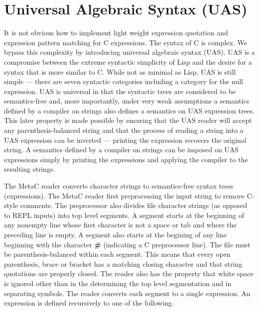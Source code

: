 \documentclass{article}
\begin{document}
\section{Universal Algebraic Syntax (UAS)}

It is not obvious how to implement light weight expression quotation and expression pattern matching for C expressions.  The syntax of C is complex.  We bypass this complexity by introducing universal algebraic syntax (UAS).
UAS is a compromise between the extreme syntactic simplicity of Lisp and the desire for a syntax that is more similar to C.
While not as minimal as Lisp, UAS is still simple --- there are seven syntactic categories including a category for the null expression.
UAS is universal in that the syntactic trees are considered to be semantics-free and, more importantly, under very weak assumptions a semantics defined by a compiler on strings
also defines a semantics on UAS expression trees.
This later property is made possible by ensuring that the UAS reader will accept any parenthesis-balanced string
and that the process of reading a string into a UAS expression can be inverted --- printing the expression recovers the original string.
A semantics defined by a compiler on strings can be imposed on UAS expressions simply by printing the expressions and applying the compiler to the resulting strings.

The MetaC reader converts character strings to semantics-free syntax trees (expressions).
The MetaC reader first preprocessing the input string to remove C-style comments.
The preprocessor also divides file character strings (as opposed to REPL inputs) into top level segments.
A segment starts at the beginning of any nonempty line whose first character is not a space or tab and where the preceding line is empty.
A segment also starts at the begining of any line beginning with the character {\bf \#} (indicating a C preprocessor line).
The file must be parenthesis-balanced within each segment.  This means that every open parenthesis, brace or bracket has a matching closing character and that string quotations
are properly closed.  The reader also has the property that white space is ignored other than in the determining the top level segmentation and in separating symbols.
The reader converts each segment to a single expression.
An expression is defined recursively to one of the following.
\end{document}
